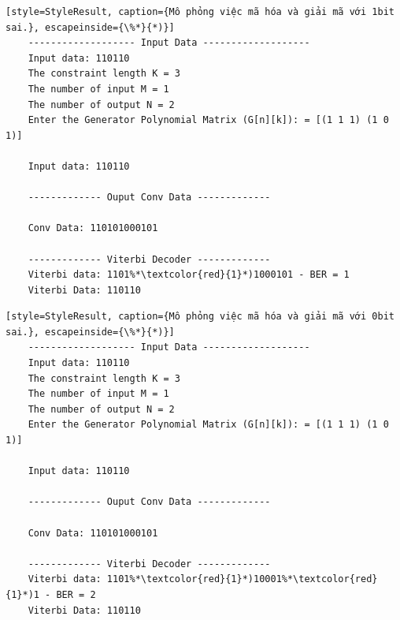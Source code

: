 \begin{lstlisting}[style=StyleResult, caption={Mô phỏng việc mã hóa và giải mã với 1bit sai.}, escapeinside={\%*}{*)}]
	------------------- Input Data -------------------
	Input data: 110110
	The constraint length K = 3
	The number of input M = 1
	The number of output N = 2
	Enter the Generator Polynomial Matrix (G[n][k]): = [(1 1 1) (1 0 1)]
	
	Input data: 110110
	
	------------- Ouput Conv Data -------------
	
	Conv Data: 110101000101
	
	------------- Viterbi Decoder -------------
	Viterbi data: 1101%*\textcolor{red}{1}*)1000101 - BER = 1
	Viterbi Data: 110110
\end{lstlisting}

\begin{lstlisting}[style=StyleResult, caption={Mô phỏng việc mã hóa và giải mã với 0bit sai.}, escapeinside={\%*}{*)}]
	------------------- Input Data -------------------
	Input data: 110110
	The constraint length K = 3
	The number of input M = 1
	The number of output N = 2
	Enter the Generator Polynomial Matrix (G[n][k]): = [(1 1 1) (1 0 1)]
	
	Input data: 110110
	
	------------- Ouput Conv Data -------------
	
	Conv Data: 110101000101
	
	------------- Viterbi Decoder -------------
	Viterbi data: 1101%*\textcolor{red}{1}*)10001%*\textcolor{red}{1}*)1 - BER = 2
	Viterbi Data: 110110
\end{lstlisting}

%